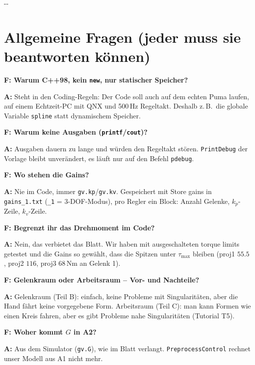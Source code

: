 \documentclass[10pt,a4paper]{article}
\makeatletter
\newcommand{\secneed}[1]{\par\penalty\@M\begingroup\setlength{\dimen@}{#1}\dimen@ii\pagegoal
  \advance\dimen@ii-\pagetotal\ifdim\dimen@>\dimen@ii\ifdim\dimen@ii>\z@\vfil\fi\penalty-\@M\fi\endgroup}
\let\oldsection\section
\renewcommand{\section}{\secneed{9\baselineskip}\oldsection}
\newcommand{\frage}[2]{\textbf{F: #1}\par\nopagebreak\vspace{1pt}\textbf{A:} #2\par\vspace{5pt}}
\newcommand{\code}[1]{\texttt{#1}}
\makeatother
\begin{document}
\section{Allgemeine Fragen (jeder muss sie beantworten können)}

\begin{fragen}
\frage{Warum C++98, kein \code{new}, nur statischer Speicher?}
{Steht in den Coding-Regeln: Der Code soll auch auf dem echten Puma laufen, auf einem Echtzeit-PC mit QNX und 500\,Hz
Regeltakt. Deshalb z.\,B.\ die globale Variable \code{spline} statt dynamischem Speicher.}
\frage{Warum keine Ausgaben (\code{printf}/\code{cout})?}
{Ausgaben dauern zu lange und würden den Regeltakt stören. \code{PrintDebug} der Vorlage bleibt unverändert, es läuft nur
auf den Befehl \code{pdebug}.}
\frage{Wo stehen die Gains?}
{Nie im Code, immer \code{gv.kp}/\code{gv.kv}. Gespeichert mit \glqq Store gains\grqq{} in \code{gains\_1.txt} (\code{\_1} =
3-DOF-Modus), pro Regler ein Block: Anzahl Gelenke, $k_p$-Zeile, $k_v$-Zeile.}
\frage{Begrenzt ihr das Drehmoment im Code?}
{Nein, das verbietet das Blatt. Wir haben mit ausgeschalteten \glqq torque limits\grqq{} getestet und die Gains so gewählt,
dass die Spitzen unter $\tau_{\max}$ bleiben (proj1 $55.5$, proj2 $116$, proj3 $68$\,Nm an Gelenk 1).}
\frage{Gelenkraum oder Arbeitsraum -- Vor- und Nachteile?}
{Gelenkraum (Teil B): einfach, keine Probleme mit Singularitäten, aber die Hand fährt keine vorgegebene Form. Arbeitsraum
(Teil C): man kann Formen wie einen Kreis fahren, aber es gibt Probleme nahe Singularitäten (Tutorial T5).}
\frage{Woher kommt $G$ in A2?}
{Aus dem Simulator (\code{gv.G}), wie im Blatt verlangt. \code{PreprocessControl} rechnet unser Modell aus A1 nicht mehr.}
\end{fragen}
\end{document}
